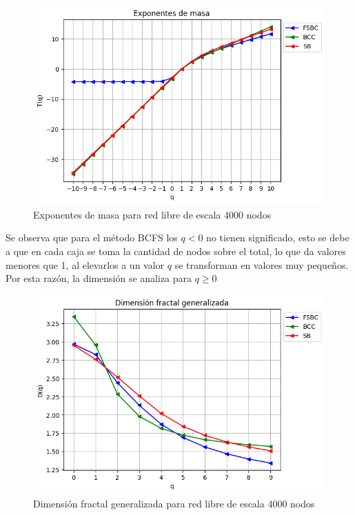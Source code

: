 \begin{figure}[H]
    \centering
    \includegraphics[scale=0.7]{Capitulo4Multifractalidad/imagenes/scaleFree4000_TqscaleFree4000Nodes.png}
    \caption{Exponentes de masa para red libre de escala 4000 nodos}
\end{figure}

Se observa que para el método BCFS los $q<0$ no tienen significado, esto se debe a que en cada caja se toma la cantidad de nodos sobre el total, lo que da valores menores que 1, al elevarlos a un valor $q$ se transforman en valores muy pequeños. Por esta razón, la dimensión se analiza para $q\geq0$

\begin{figure}[H]
    \centering
    \includegraphics[scale=0.7]{Capitulo4Multifractalidad/imagenes/scaleFree4000_DqscaleFree4000Nodes.png}
    \caption{Dimensión fractal generalizada para red libre de escala 4000 nodos}
\end{figure}

